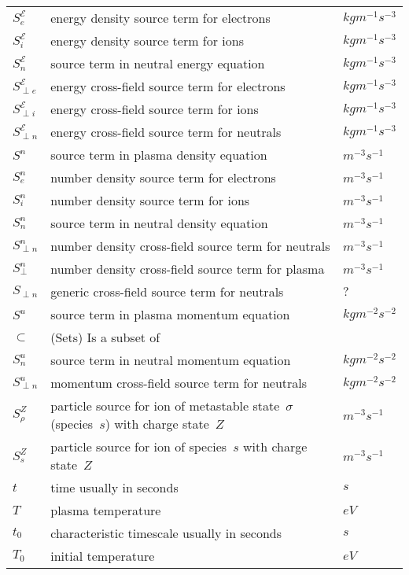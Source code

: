 \begin{longtable}{|p{3.0cm}|p{10.0cm}|p{3.0cm}|}
$S^{\mathcal{E}}_{e}$ & energy density source term for electrons  & $kg m^{-1} s^{-3}$ \\
$S^{\mathcal{E}}_{i}$ & energy density source term for ions  & $kg m^{-1} s^{-3}$ \\
$S^\mathcal{E}_n$ & source term in neutral energy equation  & $kg m^{-1} s^{-3}$ \\
$S^\mathcal{E}_{\perp e}$ & energy cross-field source term for electrons  & $kg m^{-1} s^{-3}$ \\
$S^\mathcal{E}_{\perp i}$ & energy cross-field source term for ions   & $kg m^{-1} s^{-3}$ \\
$S^\mathcal{E}_{\perp n}$ & energy cross-field source term for neutrals  & $kg m^{-1} s^{-3}$ \\
$S^n$ & source term in plasma density equation  & $m^{-3} s^{-1}$ \\
$S^n_{e}$ & number density source term for electrons  & $m^{-3} s^{-1}$ \\
$S^n_{i}$ & number density source term for ions  & $m^{-3} s^{-1}$ \\
$S^n_n$ & source term in neutral density equation  & $m^{-3} s^{-1}$ \\
$S^n_{\perp n}$ & number density cross-field source term for neutrals  & $m^{-3} s^{-1}$ \\
$S^n_{\perp}$ & number density cross-field source term for plasma  & $m^{-3} s^{-1}$ \\
$S_{\perp n}$ & generic cross-field source term for neutrals  & $?$ \\
$S^u$ & source term in plasma momentum equation  & $kg m^{-2} s^{-2}$ \\
$\subset$ &  (Sets) Is a subset of & \\
$S^u_n$ & source term in neutral momentum equation   & $kg m^{-2} s^{-2}$ \\
$S^u_{\perp n}$ & momentum cross-field source term for neutrals  & $kg m^{-2} s^{-2}$ \\
$S^Z_\rho$ & particle source for ion of metastable state~$\sigma$ (species~$s$) with charge state~$Z$  & $m^{-3} s^{-1}$ \\
$S^Z_s$ & particle source for ion of species~$s$ with charge state~$Z$  & $m^{-3} s^{-1}$ \\
$t$ & time usually in seconds  & $s$ \\
$T$ & plasma temperature  & $eV$ \\
$t_0$ & characteristic timescale usually in seconds  & $s$ \\
$T_0$ & initial temperature  & $eV$ \\

\end{longtable}
